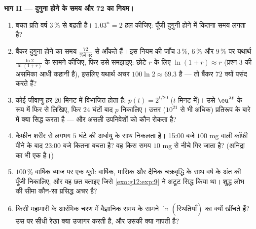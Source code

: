 \begin{problem}
\medskip
\noindent\textbf{भाग II --- दुगुना होने के समय और 72 का नियम।}
\begin{enumerate}[resume]
  \item बचत प्रति वर्ष $3\,\%$ से बढ़ती है। $1.03^n = 2$ हल कीजिए: पूँजी दुगुनी होने
        में कितना समय लगता है?
  \item बैंकर दुगुना होने का समय $\frac{72}{\text{\% में दर}}$ से आँकते हैं। इस नियम की जाँच $3\,\%$,
        $6\,\%$ और $9\,\%$ पर यथार्थ $\frac{\ln 2}{\ln(1 + r)}$ के सामने कीजिए, फिर उसे समझाइए: छोटे
        $r$ के लिए $\ln(1 + r) \approx r$ (प्रश्न 3 की असमिका आधी कहानी है), इसलिए यथार्थ
        अचर $100 \ln 2 \approx 69.3$ है --- तो बैंकर $72$ क्यों पसंद करते हैं?
  \item कोई जीवाणु हर $20$ मिनट में विभाजित होता है: $p(t) = 2^{t/20}$ ($t$ मिनट में)।
        उसे $\eu^{\lambda t}$ के रूप में फिर से लिखिए, फिर $24$ घंटों बाद $p$
        निकालिए। उत्तर ($10^{21}$ से भी अधिक) प्रतिरूप के बारे में क्या सिद्ध
        करता है --- और असली उपनिवेशों को कौन रोकता है?
  \item कैफ़ीन शरीर से लगभग $5$ घंटे की अर्धायु के साथ निकलता है। 15:00
        बजे $100$ mg वाली कॉफ़ी पीने के बाद 23:00 बजे कितना बचता है? वह किस
        समय $10$ mg से नीचे गिर जाता है? (अनिद्रा का भी एक  है।)
  \item $100\,\%$ वार्षिक ब्याज पर एक यूरो: वार्षिक, मासिक और दैनिक चक्रवृद्धि
        के साथ वर्ष के अंत की पूँजी निकालिए, और वह छत बताइए जिसे \cref{exo:g12:exp:9} ने
        अटूट सिद्ध किया था। शुद्ध लोभ की सीमा कौन-सा प्रसिद्ध अचर है?
  \item किसी महामारी के आरंभिक चरण में वैज्ञानिक समय के सामने $\ln(\text{स्थितियाँ})$ का 
        क्यों खींचते हैं? उस  पर सीधी रेखा क्या उजागर करती है, और उसकी
         क्या नापती है?
\end{enumerate}


\end{problem}
